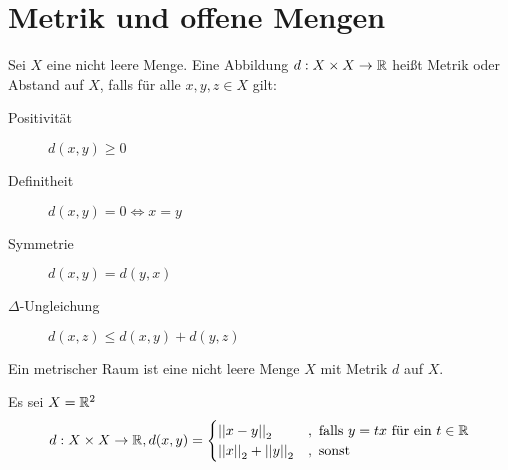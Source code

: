 \documentclass[../ana2u.tex]{subfiles}
\begin{document}
\setcounter{section}{6}
\section{Metrik und offene Mengen}
    \begin{defi}
        Sei \(X\) eine nicht leere Menge. Eine
        Abbildung \( d:X\times X\rightarrow \mathbb{R} \)
        heißt Metrik oder Abstand auf \(X\), falls
        für alle \( x,y,z \in X \) gilt:
        \begin{description}
            \item[Positivität] \( d(x,y) \geq 0 \)
            \item[Definitheit] \( d(x,y) = 0 
            \Leftrightarrow x = y \)
            \item[Symmetrie] \( d(x,y) = d(y,x) \)
            \item[\( \Delta \)-Ungleichung] \( d(x,z) 
            \leq d(x,y) + d(y,z) \)
        \end{description}
        Ein metrischer Raum ist eine nicht leere Menge \(X\)
        mit Metrik \(d\) auf \(X\).
    \end{defi}
    \begin{bsp}[Eisenbahnmetrik]
        Es sei \(X = \mathbb{R}^2\)
        \[ d:X \times X\rightarrow \mathbb{R}, d(x,y) = \begin{cases}
            \left|\left|x-y\right|\right|_2 &, \text{ falls } y = tx \text{ für ein } t \in \mathbb{R} \\
            \left|\left|x\right|\right|_2 + \left|\left|y\right|\right|_2 &, \text{ sonst}
        \end{cases} \]
    \end{bsp}
\end{document}
